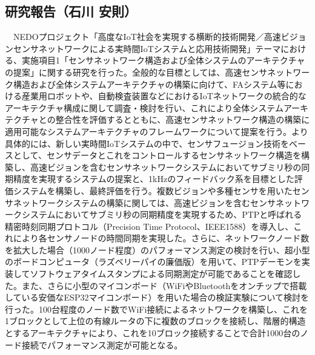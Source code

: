 \subsection{研究報告（石川 安則）}

　NEDOプロジェクト「高度なIoT社会を実現する横断的技術開発／高速ビジョンセンサネットワークによる実時間IoTシステムと応用技術開発」テーマにおける、実施項目1「センサネットワーク構造および全体システムのアーキテクチャの提案」に関する研究を行った。全般的な目標としては、高速センサネットワーク構造および全体システムアーキテクチャの構築に向けて、FAシステム等における産業用ロボットや、自動検査装置などにおけるIoTネットワークの統合的なアーキテクチャ構成に関して調査・検討を行い、これにより全体システムアーキテクチャとの整合性を評価するとともに、高速センサネットワーク構造の構築に適用可能なシステムアーキテクチャのフレームワークについて提案を行う。より具体的には、新しい実時間IoTシステムの中で、センサフュージョン技術をベースとして、センサデータとこれをコントロールするセンサネットワーク構造を構築し、高速ビジョンを含むセンサネットワークシステムにおいてサブミリ秒の同期精度を実現するシステムの提案と、1kHzのフィードバック系を目標とした評価システムを構築し、最終評価を行う。複数ビジョンや多種センサを用いたセンサネットワークシステムの構築に関しては、高速ビジョンを含むセンサネットワークシステムにおいてサブミリ秒の同期精度を実現するため、PTPと呼ばれる精密時刻同期プロトコル（Precision Time Protocol、IEEE1588）を導入し、これにより各センサノードの時間同期を実現した。さらに、ネットワークノード数を拡大した場合（1000ノード程度）のパフォーマンス測定の検討を行い、超小型のボードコンピュータ（ラズベリーパイの廉価版）を用いて、PTPデーモンを実装してソフトウェアタイムスタンプによる同期測定が可能であることを確認した。また、さらに小型のマイコンボード（WiFiやBluetoothをオンチップで搭載している安価なESP32マイコンボード）を用いた場合の検証実験について検討を行った。100台程度のノード数でWiFi接続によるネットワークを構築し、これを1ブロックとして上位の有線ルータの下に複数のブロックを接続し、階層的構造とするアーキテクチャにより、これを10ブロック接続することで合計1000台のノード接続でパフォーマンス測定が可能となる。

